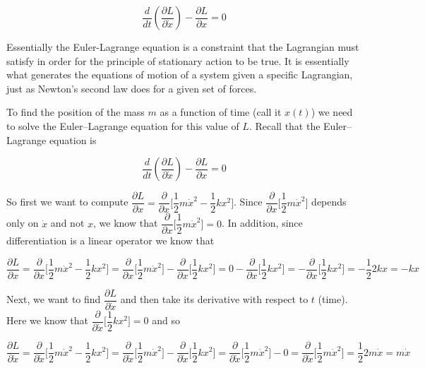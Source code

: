 \documentclass{article}
\theoremstyle{definition}
\begin{document}
\medskip
\begin{equation}
\dfrac{d}{dt} \left ( \dfrac{\partial L}{\partial \dot{x}} \right ) -  \dfrac{\partial L}{\partial x} = 0
\label{eqn:euler-lagrange}
\end{equation}

\noindent
Essentially the Euler-Lagrange equation is a constraint that the
Lagrangian must satisfy in order for the principle of stationary
action to be true. It is essentially what generates the equations
of motion of a system given a specific Lagrangian, just as
Newton’s second law does for a given set of forces. 


\bigskip
\noindent
To find the position of the mass $m$ as a function of time (call
it $x(t)$) we need to solve the Euler–Lagrange equation for this
value of $L$. Recall that the Euler–Lagrange equation is


\bigskip
\begin{equation*}
\dfrac{d}{dt} \left ( \dfrac{\partial L}{\partial \dot{x}} \right ) -  \dfrac{\partial L}{\partial x} = 0
\end{equation*}

\bigskip
\noindent
So first we want to compute $\dfrac{\partial L}{\partial x} =
\dfrac{\partial}{\partial x}  \bigg [ \dfrac{1}{2} m \dot{x}^2  -
\dfrac{1}{2} k x^2 \bigg ]$. Since $\dfrac{\partial}{\partial x} \bigg [\dfrac{1}{2} m
\dot{x}^2  \bigg ]$ depends only on $\dot{x}$ and not $x$, we know
that $\dfrac{\partial}{\partial x} \bigg [\dfrac{1}{2} m
\dot{x}^2  \bigg ] = 0$. In addition, since differentiation is a linear
operator \cite{wiki:linearity_of_differentiation} we know that

\bigskip
\begin{equation*}
\dfrac{\partial L}{\partial x} = \dfrac{\partial}{\partial x} \bigg [ \dfrac{1}{2} m \dot{x}^2  - \dfrac{1}{2} k x^2 \bigg ] 
= \dfrac{\partial}{\partial x} \bigg [\dfrac{1}{2} m \dot{x}^2  \bigg ] - \dfrac{\partial}{\partial x} \bigg [\dfrac{1}{2} k x^2  \bigg ]  
=  0 - \dfrac{\partial}{\partial x} \bigg [\dfrac{1}{2} k x^2  \bigg ] 
= - \dfrac{\partial}{\partial x} \bigg [ \dfrac{1}{2} k x^2  \bigg ]  
= - \dfrac{1}{2} 2 k x = -kx
\end{equation*}

\bigskip
\noindent
Next, we want to find  $\dfrac{\partial L}{\partial \dot{x}}$ and
then take its derivative with respect to $t$ (time). Here we know
that $\dfrac{\partial}{\partial \dot{x}} \Bigg [ \dfrac{1}{2} k
x^2 \Bigg ] = 0$ and so 


\begin{equation*}
\dfrac{\partial L}{\partial \dot{x}} = \dfrac{\partial}{\partial \dot{x}} \Bigg [ \dfrac{1}{2} m \dot{x}^2 - \dfrac{1}{2} k x^2 \Bigg ] 
= \dfrac{\partial}{\partial \dot{x}} \Bigg [ \dfrac{1}{2} m \dot{x}^2 \Bigg ] - \dfrac{\partial}{\partial \dot{x}} \Bigg [ \dfrac{1}{2} k x^2 \Bigg ] 
= \dfrac{\partial}{\partial \dot{x}} \Bigg [ \dfrac{1}{2} m \dot{x}^2 \Bigg ]  - 0
= \dfrac{\partial}{\partial \dot{x}} \Bigg [ \dfrac{1}{2} m \dot{x}^2 \Bigg ] =  \dfrac{1}{2} 2 m \dot{x} = m \dot{x}
\end{equation*}
\end{document}
